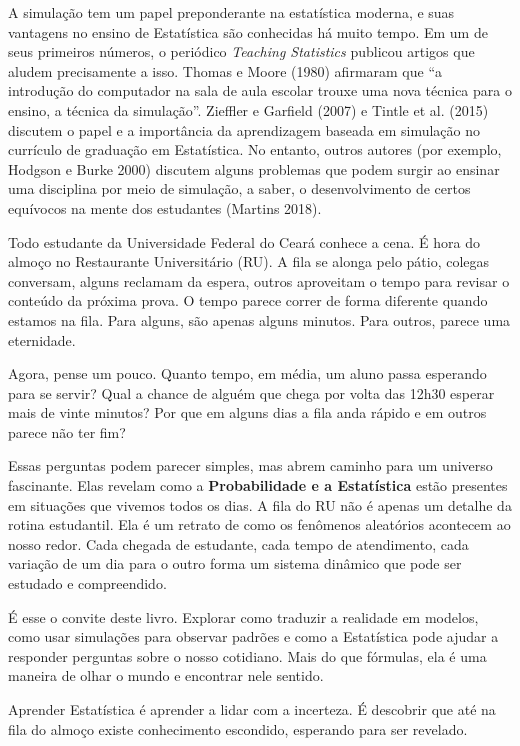 \documentclass[
  letterpaper,
  DIV=11,
  numbers=noendperiod]{scrreprt}
\begin{document}
A simulação tem um papel preponderante na estatística moderna, e suas
vantagens no ensino de Estatística são conhecidas há muito tempo. Em um
de seus primeiros números, o periódico \emph{Teaching Statistics}
publicou artigos que aludem precisamente a isso. Thomas e Moore (1980)
afirmaram que ``a introdução do computador na sala de aula escolar
trouxe uma nova técnica para o ensino, a técnica da simulação''.
Zieffler e Garfield (2007) e Tintle et al. (2015) discutem o papel e a
importância da aprendizagem baseada em simulação no currículo de
graduação em Estatística. No entanto, outros autores (por exemplo,
Hodgson e Burke 2000) discutem alguns problemas que podem surgir ao
ensinar uma disciplina por meio de simulação, a saber, o desenvolvimento
de certos equívocos na mente dos estudantes (Martins 2018).

Todo estudante da Universidade Federal do Ceará conhece a cena. É hora
do almoço no Restaurante Universitário (RU). A fila se alonga pelo
pátio, colegas conversam, alguns reclamam da espera, outros aproveitam o
tempo para revisar o conteúdo da próxima prova. O tempo parece correr de
forma diferente quando estamos na fila. Para alguns, são apenas alguns
minutos. Para outros, parece uma eternidade.

Agora, pense um pouco. Quanto tempo, em média, um aluno passa esperando
para se servir? Qual a chance de alguém que chega por volta das 12h30
esperar mais de vinte minutos? Por que em alguns dias a fila anda rápido
e em outros parece não ter fim?

Essas perguntas podem parecer simples, mas abrem caminho para um
universo fascinante. Elas revelam como a \textbf{Probabilidade e a
Estatística} estão presentes em situações que vivemos todos os dias. A
fila do RU não é apenas um detalhe da rotina estudantil. Ela é um
retrato de como os fenômenos aleatórios acontecem ao nosso redor. Cada
chegada de estudante, cada tempo de atendimento, cada variação de um dia
para o outro forma um sistema dinâmico que pode ser estudado e
compreendido.

É esse o convite deste livro. Explorar como traduzir a realidade em
modelos, como usar simulações para observar padrões e como a Estatística
pode ajudar a responder perguntas sobre o nosso cotidiano. Mais do que
fórmulas, ela é uma maneira de olhar o mundo e encontrar nele sentido.

Aprender Estatística é aprender a lidar com a incerteza. É descobrir que
até na fila do almoço existe conhecimento escondido, esperando para ser
revelado.
\end{document}
